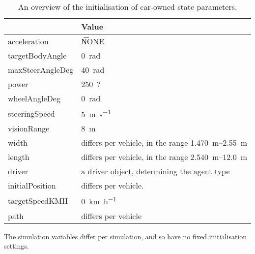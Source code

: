 \begin{table}
	\centering
	\begin{tabularx}{\textwidth}{>{\ttfamily}lX}
		\toprule
		\normalfont{Parameter}	& Value \\  
		\midrule
		acceleration 			
			& \t{NONE} \\ 
		targetBodyAngle 		
			& \SI[mode=text]{0}{\radian} \\ 
		maxSteerAngleDeg 		
			& \SI[mode=text]{40}{\radian} \\ 
		power 					
			& \SI[mode=text]{250}{?}\\ 
		wheelAngleDeg 			
			& \SI[mode=text]{0}{\radian} \\ 
		steeringSpeed 			
			& \SI[mode=text]{5}{\meter\per\second} \\ 
		visionRange 			
			& \SI[mode=text]{8}{\meter} \\ 
		width 					
			& differs per vehicle, in the range \SIrange{1.470}{2.55}{\meter} \\ 
		length 					
			& differs per vehicle, in the range \SIrange{2.540}{12.0}{\meter} \\ 
		driver 					
			& a driver object, determining the agent type \\
		initialPosition 		
			& differs per vehicle. \\ 
		targetSpeedKMH			
			& \SI[mode=text]{0}{\kilo\meter\per\hour} \\ 
		path					
			& differs per vehicle \\ 
		\bottomrule
	\end{tabularx}
	\caption{An overview of the initialisation of car-owned state parameters.}
	\label{tab:par:method:model:details:init:car:value}
\end{table} 


The simulation variables differ per simulation, and so have no fixed initialisation settings.


